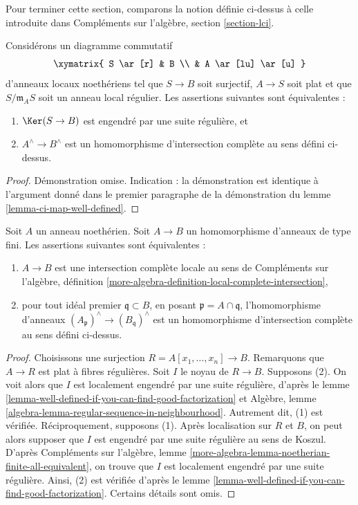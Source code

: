\noindent
Pour terminer cette section, comparons la notion définie ci-dessus
à celle introduite dans
Compléments sur l'algèbre, section \ref{section-lci}.

\begin{lemma}
\label{lemma-well-defined-if-you-can-find-good-factorization}
Considérons un diagramme commutatif
$$
\xymatrix{
S \ar[r] & B \\
& A \ar[lu] \ar[u]
}
$$
d'anneaux locaux noethériens tel que $S \to B$ soit surjectif, $A \to S$ soit plat et que
$S/\mathfrak m_A S$ soit un anneau local régulier. Les assertions suivantes sont équivalentes :
\begin{enumerate}
\item $\Ker(S \to B)$ est engendré par une suite régulière, et
\item $A^\wedge\to B^\wedge$ est un homomorphisme d'intersection complète au
sens défini ci-dessus.
\end{enumerate}
\end{lemma}

\begin{proof}
Démonstration omise. Indication : la démonstration est identique à l'argument donné
dans le premier paragraphe de la démonstration du lemme \ref{lemma-ci-map-well-defined}.
\end{proof}

\begin{lemma}
\label{lemma-finite-type-lci-map}
Soit $A$ un anneau noethérien.
Soit $A \to B$ un homomorphisme d'anneaux de type fini.
Les assertions suivantes sont équivalentes :
\begin{enumerate}
\item $A \to B$ est une intersection complète locale au sens de
Compléments sur l'algèbre, définition
\ref{more-algebra-definition-local-complete-intersection},
\item pour tout idéal premier $\mathfrak q \subset B$, en posant
$\mathfrak p = A \cap\mathfrak q$, l'homomorphisme d'anneaux
$(A_\mathfrak p)^\wedge\to (B_\mathfrak q)^\wedge$ est
un homomorphisme d'intersection complète au sens défini ci-dessus.
\end{enumerate}
\end{lemma}

\begin{proof}
Choisissons une surjection $R = A[x_1, \ldots, x_n] \to B$.
Remarquons que $A \to R$ est plat à fibres régulières.
Soit $I$ le noyau de $R \to B$.
Supposons (2). On voit alors que
$I$ est localement engendré par une suite régulière,
d'après le
lemme \ref{lemma-well-defined-if-you-can-find-good-factorization}
et
Algèbre, lemme \ref{algebra-lemma-regular-sequence-in-neighbourhood}.
Autrement dit, (1) est vérifiée.
Réciproquement, supposons (1). Après localisation sur $R$ et $B$,
on peut alors supposer que $I$ est engendré par une suite régulière au sens de Koszul.
D'après Compléments sur l'algèbre, lemme
\ref{more-algebra-lemma-noetherian-finite-all-equivalent},
on trouve que $I$ est localement engendré par une suite régulière. Ainsi,
(2) est vérifiée d'après le
lemme \ref{lemma-well-defined-if-you-can-find-good-factorization}.
Certains détails sont omis.
\end{proof}

